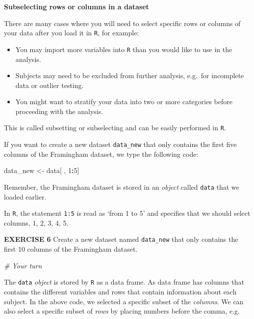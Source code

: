 \documentclass[
]{article}
\newenvironment{Shaded}{\begin{snugshade}}{\end{snugshade}}
\newcommand{\CommentTok}[1]{\textcolor[rgb]{0.56,0.35,0.01}{\textit{#1}}}
\newcommand{\DecValTok}[1]{\textcolor[rgb]{0.00,0.00,0.81}{#1}}
\newcommand{\NormalTok}[1]{#1}
\newcommand{\OperatorTok}[1]{\textcolor[rgb]{0.81,0.36,0.00}{\textbf{#1}}}
\newcommand{\StringTok}[1]{\textcolor[rgb]{0.31,0.60,0.02}{#1}}
\begin{document}
\textbf{Subselecting rows or columns in a dataset}

There are many cases where you will need to select specific rows or
columns of your data after you load it in \texttt{R}, for example:

\begin{itemize}
\item
  You may import more variables into \texttt{R} than you would like to
  use in the analysis.
\item
  Subjects may need to be excluded from further analysis, e.g.~for
  incomplete data or outlier testing.
\item
  You might want to stratify your data into two or more categories
  before proceeding with the analysis.
\end{itemize}

This is called subsetting or subselecting and can be easily performed in
\texttt{R}.

If you want to create a new dataset \texttt{data\_new} that only
contains the first five columns of the Framingham dataset, we type the
following code:

\begin{Shaded}
\begin{Highlighting}[]
\NormalTok{data_new <-}\StringTok{ }\NormalTok{data[ , }\DecValTok{1}\OperatorTok{:}\DecValTok{5}\NormalTok{]}
\end{Highlighting}
\end{Shaded}

Remember, the Framingham dataset is stored in an \emph{object} called
\texttt{data} that we loaded earlier.

In \texttt{R}, the statement \texttt{1:5} is read as `from 1 to 5' and
specifies that we should select columns, 1, 2, 3, 4, 5.

\textbf{EXERCISE 6} Create a new dataset named \texttt{data\_new} that
only contains the first 10 columns of the Framingham dataset.

\begin{Shaded}
\begin{Highlighting}[]
\CommentTok{# Your turn}
\end{Highlighting}
\end{Shaded}

The \texttt{data} \emph{object} is stored by \texttt{R} as a data frame.
As data frame has columns that contains the different variables and rows
that contain information about each subject. In the above code, we
selected a specific subset of the \emph{columns}. We can also select a
specific subset of \emph{rows} by placing numbers before the comma,
e.g.~
\end{document}
